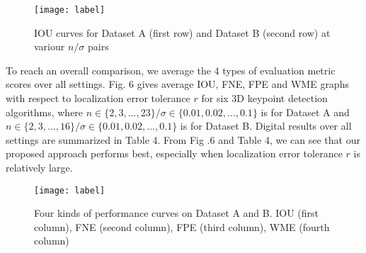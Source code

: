 \documentclass[runningheads]{article}
\begin{document}
\begin{figure}[!htb]
	\centering

	\texttt{[image: label]}
	\begin{minipage}[b]{1\linewidth}
		\caption{IOU curves for Dataset A (first row) and Dataset B (second row) at variour \emph{$n/\sigma$} pairs}
	\end{minipage}
\end{figure}

To reach an overall comparison, we average the 4 types of evaluation metric scores over all settings. Fig. 6 gives average IOU, FNE, FPE and WME graphs with respect to localization error tolerance \emph{$r$} for six 3D keypoint detection algorithms, where \emph{$n \in \{2,3,...,23\} / \sigma \in \{0.01,0.02,...,0.1\}$} is for Dataset A and \emph{$n \in \{2,3,...,16\} / \sigma \in \{0.01,0.02,...,0.1\}$} is for Dataset B. Digital results over all settings are summarized in Table 4. From Fig .6 and Table 4, we can see that our proposed approach performs best, especially when localization error tolerance \emph{$r$} is relatively large.

\begin{figure}[!htb]
	\centering

	\texttt{[image: label]}
	\begin{minipage}[b]{1\linewidth}
		\caption{Four kinds of performance curves on Dataset A and B. IOU (first column), FNE (second column), FPE (third column), WME (fourth column)}
	\end{minipage}
\end{figure}
\end{document}
